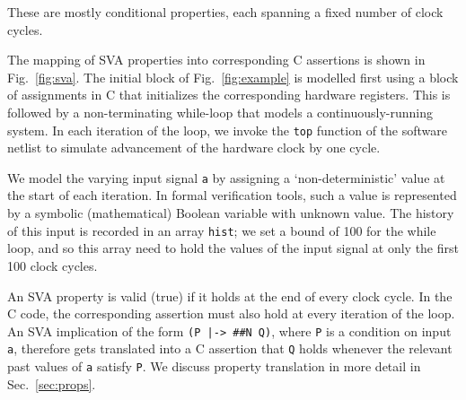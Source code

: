 \noindent These are mostly conditional properties, each spanning a fixed number of clock cycles. 
 
The mapping of SVA properties into corresponding C assertions is shown in Fig.\ \ref{fig:sva}. The initial block of Fig.\ \ref{fig:example} is modelled first using a block of assignments in C that initializes the corresponding hardware registers.  This is followed by a non-terminating while-loop that models a continuously-running system. In each iteration of the loop, we invoke the \texttt{top} function of the software netlist to simulate advancement of the hardware clock by one cycle. 

We model the varying input signal \texttt{a} by assigning a `non-deterministic' value at the start of each iteration. In formal verification tools, such a value is represented by a symbolic (mathematical) Boolean variable with unknown value. The history of this input is recorded in an array \texttt{hist}; we set a bound of 100 for the while loop, and so this array need to hold the values of the input signal at only the first 100 clock cycles.

An SVA property is valid (true) if it holds at the end of every clock cycle. In the C code, the corresponding assertion must also hold at every iteration of the loop. An SVA implication of the form \texttt{(P |-> \#\#N Q)}, where \texttt{P} is a condition on input \texttt{a}, therefore gets translated into a C assertion that \texttt{Q} holds whenever the relevant past values of \texttt{a} satisfy \texttt{P}. We discuss property translation in more detail in Sec.\ \ref{sec:props}.

